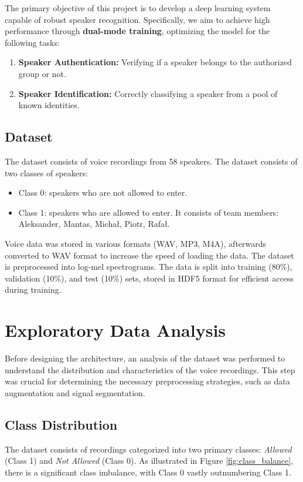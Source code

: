 \documentclass[12pt,a4paper]{article}
\newcommand{\numSpeakers}{58}
\newcommand{\train}{(80\%)}
\newcommand{\validate}{(10\%)}
\newcommand{\test}{(10\%)}
\begin{document}
The primary objective of this project is to develop a deep learning system capable of robust speaker recognition.
Specifically, we aim to achieve high performance through \textbf{dual-mode training}, optimizing the model for the following tasks:
\begin{enumerate}
    \item \textbf{Speaker Authentication:} Verifying if a speaker belongs to the authorized group or not.
    \item \textbf{Speaker Identification:} Correctly classifying a speaker from a pool of known identities.
\end{enumerate}

\subsection{Dataset}

The dataset consists of voice recordings from \numSpeakers{} speakers. 
The dataset consists of two classes of speakers:
\begin{itemize}
    \item Class 0: speakers who are not allowed to enter.
    \item Class 1: speakers who are allowed to enter. It consists of team members: Aleksander, Mantas, Michał, Piotr, Rafał.
\end{itemize}    

Voice data was stored in various formats (WAV, MP3, M4A), afterwards converted to WAV format to increase the speed of loading the data.
The dataset is preprocessed into log-mel spectrograms.
The data is split into training \train{}, validation \validate{}, and test \test{} sets, stored in HDF5 format for efficient access during training.



\section{Exploratory Data Analysis}

Before designing the architecture, an analysis of the dataset was performed to understand the distribution and characteristics of the voice recordings. This step was crucial for determining the necessary preprocessing strategies, such as data augmentation and signal segmentation.

\subsection{Class Distribution}
The dataset consists of recordings categorized into two primary classes: \textit{Allowed} (Class 1) and \textit{Not Allowed} (Class 0).
As illustrated in Figure \ref{fig:class_balance}, there is a significant class imbalance, with Class 0 vastly outnumbering Class 1.  
\end{document}
